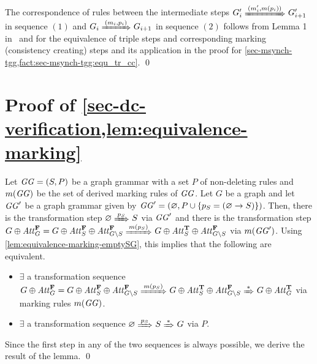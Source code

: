 The correspondence of rules between the intermediate steps $G'_i \Trans{(m'_i,m(p_i))} G'_{i+1}$ in sequence $(1)$ and $G_i \Trans{(m_i,p_i)} G_{i+1}$ in sequence $(2)$ follows from Lemma 1 in~\cite{heocdx11} and for the equivalence of triple steps and corresponding marking (consistency creating) steps and its application in the proof for \cref{sec-msynch-tgg,fact:sec-msynch-tgg:equ_tr_cc}.
\qed

\section{Proof of \cref{sec-dc-verification,lem:equivalence-marking}}
\label{sec-proofs:lem:equivalence-marking}
Let $\mathit{GG}=(S,P)$ be a graph grammar with a set $P$ of non-deleting rules and $m(\mathit{GG})$ be the set of derived marking rules of $\mathit{GG}$. 
Let $G$ be a graph and let $\mathit{GG}'$ be a graph grammar given by $\mathit{GG}'=(\varnothing, P \cup \{p_{S}=(\varnothing \to S)\})$.
Then, there is the transformation step $\varnothing \Trans{p_{S}} S$ via $\mathit{GG}'$ and there is the transformation step $G \oplus \Att_G^\False = G \oplus \Att_{S}^\False \oplus \Att_{G\setminus S}^\False \Trans{m(p_{S})} G \oplus \Att_{S}^\True \oplus \Att_{G\setminus S}^\False$ via $m(\mathit{GG}')$.
Using \cref{lem:equivalence-marking-emptySG}, this implies that the following are equivalent.
\begin{itemize}
	\item $\exists$ a transformation sequence $G \oplus \Att_G^\False = G \oplus \Att_{S}^\False \oplus \Att_{G\setminus S}^\False \Trans{m(p_{S})} G \oplus \Att_{S}^\True \oplus \Att_{G\setminus S}^\False \Trans{*} G \oplus \Att_G^\True$ via marking rules $m(\mathit{GG})$.%
	\item $\exists$ a transformation sequence $\varnothing \Trans{p_{S}} S \Trans{*} G$	via $P$.%
\end{itemize}
Since the first step in any of the two sequences is always possible, we derive the result of the lemma.
\qed

